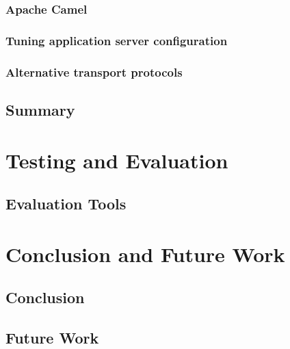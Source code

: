 \documentclass[USenglish]{ifimaster}
\begin{document}
\subsection{Apache Camel}

\subsection{Tuning application server configuration}

\subsection{Alternative transport protocols}

\section{Summary}

\chapter{Testing and Evaluation}
\section{Evaluation Tools}

\chapter{Conclusion and Future Work}
\section{Conclusion}

\section{Future Work}

\pagebreak
\printbibliography{}
\printglossaries
\end{document}
